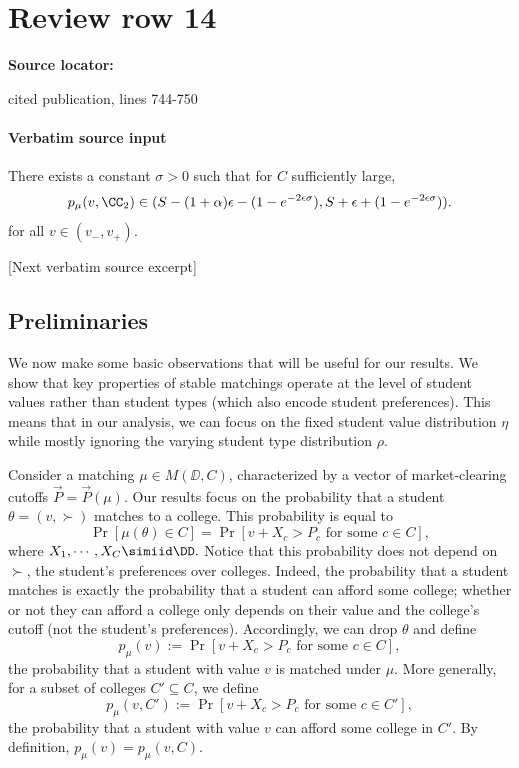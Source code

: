 \documentclass[10pt]{article}
\begin{document}
\section*{Review row 14}
\textbf{Source locator:} {\footnotesize\raggedright cited publication, lines 744-\allowbreak{}750\par}
\paragraph{Verbatim source input}
\begin{ReviewVerbatim}
\begin{proposition}\label{prop:lt-large-firms}
There exists a constant $\sigma > 0$ such that for $C$ sufficiently large,
    \begin{equation}\label{eq:lt-large-firms}
    p_\mu(v, \CC_2) \in (S - (1 + \alpha)\epsilon - (1 - e^{-2\epsilon\sigma}), S + \epsilon + (1 - e^{-2\epsilon\sigma})).
    \end{equation}
for all $v\in (v_-, v_+).$
\end{proposition}

[Next verbatim source excerpt]

\subsection{Preliminaries}
We now make some basic observations that will be useful for our results. We show that key properties of stable matchings operate at the level of student values rather than student types (which also encode student preferences). This means that in our analysis, we can focus on the fixed student value distribution $\eta$ while mostly ignoring the varying student type distribution $\rho$.

Consider a matching $\mu\in M(\DD, C)$, characterized by a vector of market-clearing cutoffs $\vec{P}=\vec{P}(\mu)$. Our results focus on the probability that a student $\theta=(v,\succ)$ matches to a college. This probability is equal to
\begin{equation}
    \Pr[\mu(\theta)\in C] = \Pr[v + X_c > P_c\text{ for some $c\in C$}],
\end{equation}
where $X_1, \cdots, X_C \simiid \DD.$ Notice that this probability does not depend on $\succ$, the student's preferences over colleges. Indeed, the probability that a student matches is exactly the probability that a student can afford some college; whether or not they can afford a college only depends on their value and the college's cutoff (not the student's preferences). Accordingly, we can drop $\theta$ and define
\begin{equation}
    p_\mu(v) := \Pr[v + X_c > P_c\text{ for some $c\in C$}],
\end{equation}
the probability that a student with value $v$ is matched under $\mu$. More generally, for a subset of colleges $C'\subseteq C$, we define
\begin{equation}
    p_\mu(v, C') := \Pr[v + X_c > P_c\text{ for some $c\in C'$}],
\end{equation}
the probability that a student with value $v$ can afford some college in $C'$. By definition, $p_\mu(v) = p_\mu(v, C).$


\end{ReviewVerbatim}
\end{document}
